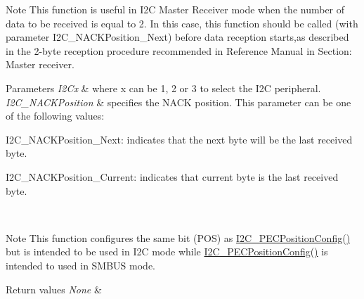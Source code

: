 \begin{DoxyNote}{Note}
This function is useful in I2C Master Receiver mode when the number of data to be received is equal to 2. In this case, this function should be called (with parameter I2\+C\+\_\+\+N\+A\+C\+K\+Position\+\_\+\+Next) before data reception starts,as described in the 2-\/byte reception procedure recommended in Reference Manual in Section\+: Master receiver. ~\newline

\end{DoxyNote}

\begin{DoxyParams}{Parameters}
{\em I2\+Cx} & where x can be 1, 2 or 3 to select the I2C peripheral. \\
\hline
{\em I2\+C\+\_\+\+N\+A\+C\+K\+Position} & specifies the N\+A\+CK position. This parameter can be one of the following values\+: \begin{DoxyItemize}
\item I2\+C\+\_\+\+N\+A\+C\+K\+Position\+\_\+\+Next\+: indicates that the next byte will be the last received byte. ~\newline
 \item I2\+C\+\_\+\+N\+A\+C\+K\+Position\+\_\+\+Current\+: indicates that current byte is the last received byte.\end{DoxyItemize}
\\
\hline
\end{DoxyParams}
\begin{DoxyNote}{Note}
This function configures the same bit (P\+OS) as \mbox{\hyperlink{group___i2_c___group3_ga5d0f939bdd45542502827bf408f24161}{I2\+C\+\_\+\+P\+E\+C\+Position\+Config()}} but is intended to be used in I2C mode while \mbox{\hyperlink{group___i2_c___group3_ga5d0f939bdd45542502827bf408f24161}{I2\+C\+\_\+\+P\+E\+C\+Position\+Config()}} is intended to used in S\+M\+B\+US mode.
\end{DoxyNote}

\begin{DoxyRetVals}{Return values}
{\em None} & \\
\hline
\end{DoxyRetVals}
\mbox{\label{group___i2_c___group1_ga7be2cc634a613c8e3539137e897a22df}} 
